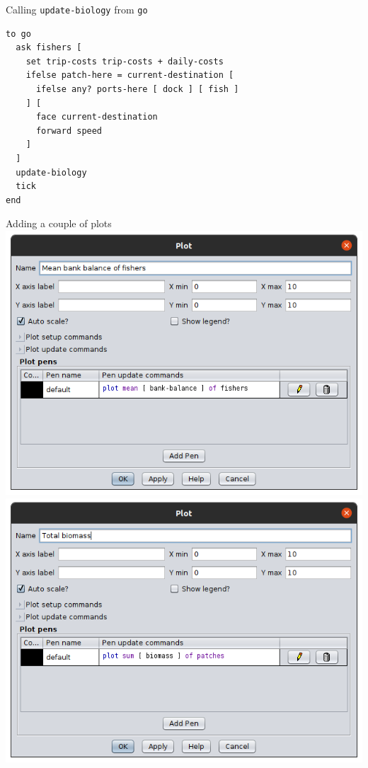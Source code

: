 \documentclass[table, 14pt, aspectratio=169]{beamer}
\begin{document}
\begin{frame}[fragile=singleslide]{Calling \texttt{update-biology} from \texttt{go}}
  \begin{adjustbox}{max width=\linewidth}\small
  \begin{verbatim}
to go
  ask fishers [
    set trip-costs trip-costs + daily-costs
    ifelse patch-here = current-destination [
      ifelse any? ports-here [ dock ] [ fish ]
    ] [
      face current-destination
      forward speed
    ]
  ]
  update-biology
  tick
end
    \end{verbatim}
  \end{adjustbox}
\end{frame}


\begin{frame}{Adding a couple of plots}
  \vfill
  \includegraphics[width=0.49\linewidth]{images/plot_balance.png}\hfill
  \includegraphics[width=0.49\linewidth]{images/plot_biomass.png}
  \vfill
\end{frame}
\end{document}
